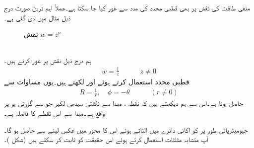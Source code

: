 منفی طاقت کی نقش  پر بھی قطبی محدد کی مدد سے غور کیا جا سکتا ہے۔عملاً اہم ترین صورت درج ذیل مثال میں دی گئی ہے۔
\begin{figure}
\centering
{}
\caption{نقش $w=z^n\,$}
\label{شکل_نقش_عمومی_طاقت}
\end{figure}

\quad {}\\
ہم درج ذیل نقش پر غور کرتے ہیں۔
\begin{align}\label{مساوات_نقش_الٹ_جانا_الف}
w=\frac{1}{z}\quad \quad \quad z\ne 0
\end{align}
قطبی محدد استعمال کرتے ہوئے  اور  لکھتے ہیں۔یوں مساوات  سے
\begin{align}
R=\frac{1}{r},\quad \phi=-\theta\quad \quad \quad (r\ne 0)
\end{align}
حاصل ہوتا ہے۔اس سے ہم دیکھتے ہیں کہ نقطہ ، مبدا سے نکلتی سیدھی لکیر جو  سے گزرتی ہو پر واقع ہے۔مبدا سے اس نقطے کا فاصلہ  ہے۔

جیومیٹریائی طور پر  کو اکائی دائرے میں الٹاتے ہوئے اس کا  محور میں عکس لینے سے   حاصل ہو گا۔آپ متشابہ مثلثات  استعمال کرتے ہوئے اس حقیقت کو ثابت کر سکتے ہیں (شکل  )۔

